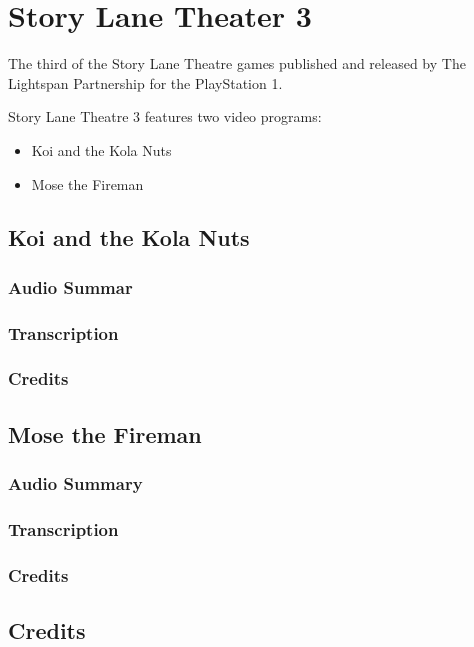\chapter{Story Lane Theater 3}


The third of the Story Lane Theatre games published and released by The Lightspan Partnership for the PlayStation 1.

Story Lane Theatre 3 features two video programs:

\begin{itemize}
    \item Koi and the Kola Nuts
    \item Mose the Fireman
\end{itemize}

\clearpage
\newpage

\section{Koi and the Kola Nuts}

\subsection{Audio Summar}

\subsection{Transcription}

\subsection{Credits}

\section{Mose the Fireman}

\subsection{Audio Summary}

\subsection{Transcription}

\subsection{Credits}

\section{Credits}